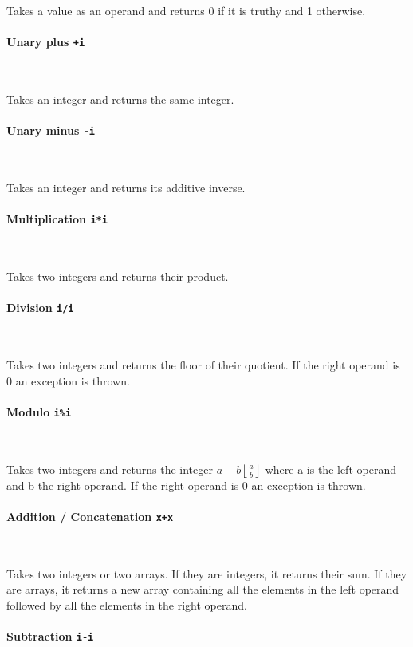 Takes a value as an operand and returns 0 if it is truthy and 1 otherwise.

\paragraph{Unary plus \quad \texttt{+i}} \

Takes an integer and returns the same integer.

\paragraph{Unary minus \quad \texttt{-i}} \

Takes an integer and returns its additive inverse.

\paragraph{Multiplication \quad \texttt{i*i}} \

Takes two integers and returns their product.

\paragraph{Division \quad \texttt{i/i}} \

Takes two integers and returns the floor of their quotient. If the right operand is 0 an exception is thrown.

\paragraph{Modulo \quad \texttt{i\%i}} \

Takes two integers and returns the integer $ a - b \left\lfloor \frac{a}{b} \right\rfloor $ where a is the left operand and b the right operand. If the right operand is 0 an exception is thrown.

\paragraph{Addition / Concatenation \quad \texttt{x+x}} \

Takes two integers or two arrays. If they are integers, it returns their sum. If they are arrays, it returns a new array containing all the elements in the left operand followed by all the elements in the right operand.

\paragraph{Subtraction \quad \texttt{i-i}} \

